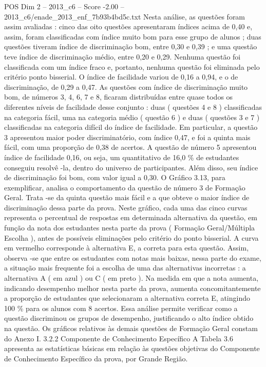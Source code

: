 \begin{textsample}{POS Dim 2 – 2013\_c6 – Score -2.00 – 2013\_c6/enade\_2013\_enf\_7b93b4bd5c.txt}
Nesta análise, as questões foram assim avaliadas : cinco das oito questões apresentaram índices acima de 0,40 e, assim, foram classificadas com índice muito bom para esse grupo de alunos ; duas questões tiveram índice de discriminação bom, entre 0,30 e 0,39 ; e uma questão teve índice de discriminação médio, entre 0,20 e 0,29.
Nenhuma questão foi classificada com um índice fraco e, portanto, nenhuma questão foi eliminada pelo critério ponto bisserial.
O índice de facilidade variou de 0,16 a 0,94, e o de discriminação, de 0,29 a 0,47.
As questões com índice de discriminação muito bom, de números 3, 4, 6, 7 e 8, ficaram distribuídas entre quase todos os diferentes níveis de facilidade desse conjunto : duas ( questões 4 e 8 ) classificadas na categoria fácil, uma na categoria médio ( questão 6 ) e duas ( questões 3 e 7 ) classificadas na categoria difícil do índice de facilidade.
Em particular, a questão 3 apresentou maior poder discriminatório, com índice 0,47, e foi a quinta mais fácil, com uma proporção de 0,38 de acertos.
A questão de número 5 apresentou índice de facilidade 0,16, ou seja, um quantitativo de 16,0 \% de estudantes conseguiu resolvê -la, dentro do universo de participantes.
Além disso, seu índice de discriminação foi bom, com valor igual a 0,30.
O Gráfico 3.13, para exemplificar, analisa o comportamento da questão de número 3 de Formação Geral.
Trata -se da quinta questão mais fácil e a que obteve o maior índice de discriminação dessa parte da prova.
Neste gráfico, cada uma das cinco curvas representa o percentual de respostas em determinada alternativa da questão, em função da nota dos estudantes nesta parte da prova ( Formação Geral/Múltipla Escolha ), antes de possíveis eliminações pelo critério do ponto bisserial.
A curva em vermelho corresponde à alternativa E, a correta para esta questão.
Assim, observa -se que entre os estudantes com notas mais baixas, nessa parte do exame, a situação mais frequente foi a escolha de uma das alternativas incorretas : a alternativa A ( em azul ) ou C ( em preto ).
Na medida em que a nota aumenta, indicando desempenho melhor nesta parte da prova, aumenta concomitantemente a proporção de estudantes que selecionaram a alternativa correta E, atingindo 100 \% para os alunos com 8 acertos.
Essa análise permite verificar como a questão discriminou os grupos de desempenho, justificando o alto índice obtido na questão.
Os gráficos relativos às demais questões de Formação Geral constam do Anexo I. 3.2.2 Componente de Conhecimento Específico A Tabela 3.6 apresenta as estatísticas básicas em relação às questões objetivas do Componente de Conhecimento Específico da prova, por Grande Região.

\end{textsample}
